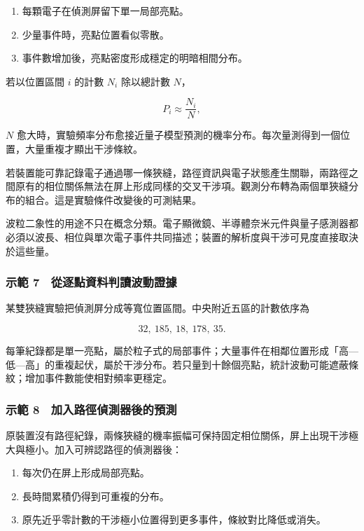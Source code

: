 \documentclass[11pt,a4paper]{article}
\providecommand{\tightlist}{%
  \setlength{\itemsep}{0pt}\setlength{\parskip}{0pt}}
\begin{document}
\begin{enumerate}
\def\labelenumi{\arabic{enumi}.}
\tightlist
\item
  每顆電子在偵測屏留下單一局部亮點。
\item
  少量事件時，亮點位置看似零散。
\item
  事件數增加後，亮點密度形成穩定的明暗相間分布。
\end{enumerate}

若以位置區間 \(i\) 的計數 \(N_i\) 除以總計數 \(N\)，

\[
P_i\approx\frac{N_i}{N},
\]

\(N\) 愈大時，實驗頻率分布愈接近量子模型預測的機率分布。每次量測得到一個位置，大量重複才顯出干涉條紋。

若裝置能可靠記錄電子通過哪一條狹縫，路徑資訊與電子狀態產生關聯，兩路徑之間原有的相位關係無法在屏上形成同樣的交叉干涉項。觀測分布轉為兩個單狹縫分布的組合。這是實驗條件改變後的可測結果。

波粒二象性的用途不只在概念分類。電子顯微鏡、半導體奈米元件與量子感測器都必須以波長、相位與單次電子事件共同描述；裝置的解析度與干涉可見度直接取決於這些量。

\subsubsection{示範 7　從逐點資料判讀波動證據}\label{ux793aux7bc4-7-ux5f9eux9010ux9edeux8cc7ux6599ux5224ux8b80ux6ce2ux52d5ux8b49ux64da}

某雙狹縫實驗把偵測屏分成等寬位置區間。中央附近五區的計數依序為

\[
32,\ 185,\ 18,\ 178,\ 35.
\]

每筆紀錄都是單一亮點，屬於粒子式的局部事件；大量事件在相鄰位置形成「高---低---高」的重複起伏，屬於干涉分布。若只量到十餘個亮點，統計波動可能遮蔽條紋；增加事件數能使相對頻率更穩定。

\subsubsection{示範 8　加入路徑偵測器後的預測}\label{ux793aux7bc4-8-ux52a0ux5165ux8defux5f91ux5075ux6e2cux5668ux5f8cux7684ux9810ux6e2c}

原裝置沒有路徑紀錄，兩條狹縫的機率振幅可保持固定相位關係，屏上出現干涉極大與極小。加入可辨認路徑的偵測器後：

\begin{enumerate}
\def\labelenumi{\arabic{enumi}.}
\tightlist
\item
  每次仍在屏上形成局部亮點。
\item
  長時間累積仍得到可重複的分布。
\item
  原先近乎零計數的干涉極小位置得到更多事件，條紋對比降低或消失。
\end{enumerate}
\end{document}
